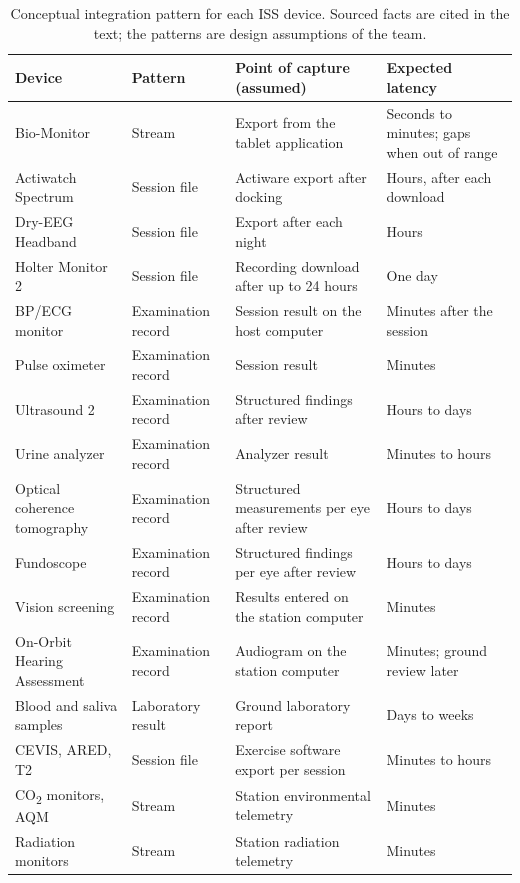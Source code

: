 \begin{table}[htbp]
\centering
\vspace{0.8em}
\caption{Conceptual integration pattern for each ISS device. Sourced facts are cited in the text; the patterns are design assumptions of the team.}
\label{tab:integration-patterns}
\footnotesize
\begin{tabular}{p{3.0cm}p{2.6cm}p{4.4cm}p{4.0cm}}
\hline
\textbf{Device} & \textbf{Pattern} & \textbf{Point of capture (assumed)} & \textbf{Expected latency} \\
\hline
Bio-Monitor & Stream & Export from the tablet application & Seconds to minutes; gaps when out of range \\
Actiwatch Spectrum & Session file & Actiware export after docking & Hours, after each download \\
Dry-EEG Headband & Session file & Export after each night & Hours \\
Holter Monitor 2 & Session file & Recording download after up to 24 hours & One day \\
BP/ECG monitor & Examination record & Session result on the host computer & Minutes after the session \\
Pulse oximeter & Examination record & Session result & Minutes \\
Ultrasound 2 & Examination record & Structured findings after review & Hours to days \\
Urine analyzer & Examination record & Analyzer result & Minutes to hours \\
Optical coherence tomography & Examination record & Structured measurements per eye after review & Hours to days \\
Fundoscope & Examination record & Structured findings per eye after review & Hours to days \\
Vision screening & Examination record & Results entered on the station computer & Minutes \\
On-Orbit Hearing Assessment & Examination record & Audiogram on the station computer & Minutes; ground review later \\
Blood and saliva samples & Laboratory result & Ground laboratory report & Days to weeks \\
CEVIS, ARED, T2 & Session file & Exercise software export per session & Minutes to hours \\
CO\textsubscript{2} monitors, AQM & Stream & Station environmental telemetry & Minutes \\
Radiation monitors & Stream & Station radiation telemetry & Minutes \\

\end{tabular}
\end{table}
